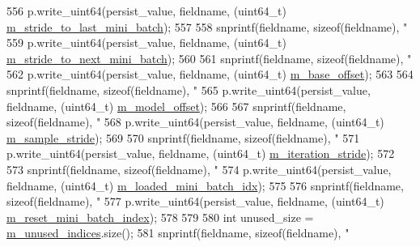 \begin{DoxyCode}
{{{{{{556     p.write\_uint64(persist\_value, fieldname, (uint64\_t) 
      \hyperlink{classlbann_1_1generic__data__reader_ac46922f2ef4f392bcc7c59c21685a3ff}{m\_stride\_to\_last\_mini\_batch});
557 
558     snprintf(fieldname, \textcolor{keyword}{sizeof}(fieldname), \textcolor{stringliteral}{"%
559     p.write\_uint64(persist\_value, fieldname, (uint64\_t) 
      \hyperlink{classlbann_1_1generic__data__reader_a02c4632cc7cad5c3e4062934c41717a0}{m\_stride\_to\_next\_mini\_batch});
560 
561     snprintf(fieldname, \textcolor{keyword}{sizeof}(fieldname), \textcolor{stringliteral}{"%
562     p.write\_uint64(persist\_value, fieldname, (uint64\_t) \hyperlink{classlbann_1_1generic__data__reader_a77946c4dca753c23f39e9a490eba1229}{m\_base\_offset});
563 
564     snprintf(fieldname, \textcolor{keyword}{sizeof}(fieldname), \textcolor{stringliteral}{"%
565     p.write\_uint64(persist\_value, fieldname, (uint64\_t) \hyperlink{classlbann_1_1generic__data__reader_a5d9a0efd1ebe43a74911c35ffe84edc9}{m\_model\_offset});
566 
567     snprintf(fieldname, \textcolor{keyword}{sizeof}(fieldname), \textcolor{stringliteral}{"%
568     p.write\_uint64(persist\_value, fieldname, (uint64\_t) \hyperlink{classlbann_1_1generic__data__reader_a58461c39de7e17eafc5b98aec99cbb9b}{m\_sample\_stride});
569 
570     snprintf(fieldname, \textcolor{keyword}{sizeof}(fieldname), \textcolor{stringliteral}{"%
571     p.write\_uint64(persist\_value, fieldname, (uint64\_t) \hyperlink{classlbann_1_1generic__data__reader_a73b23a2e7768db4e9e8ba4d9a362163a}{m\_iteration\_stride});
572 
573     snprintf(fieldname, \textcolor{keyword}{sizeof}(fieldname), \textcolor{stringliteral}{"%
574     p.write\_uint64(persist\_value, fieldname, (uint64\_t) \hyperlink{classlbann_1_1generic__data__reader_a2cfc5a3e6de8a8a24d3525ec3ed586fb}{m\_loaded\_mini\_batch\_idx});
575 
576     snprintf(fieldname, \textcolor{keyword}{sizeof}(fieldname), \textcolor{stringliteral}{"%
577     p.write\_uint64(persist\_value, fieldname, (uint64\_t) \hyperlink{classlbann_1_1generic__data__reader_af29f62579a408d1548a124442bcf181d}{m\_reset\_mini\_batch\_index});
578   
579 
580     \textcolor{keywordtype}{int} unused\_size = \hyperlink{classlbann_1_1generic__data__reader_a0bc0ee42e95d23687ddcc30d6c338b19}{m\_unused\_indices}.size();
581     snprintf(fieldname, \textcolor{keyword}{sizeof}(fieldname), \textcolor{stringliteral}{"%
}}}}}}}}}}}}}}
\end{DoxyCode}
